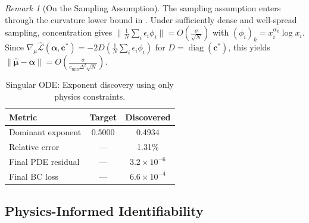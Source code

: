 \documentclass{article}
\theoremstyle{plain}
\theoremstyle{definition}
\theoremstyle{remark}
\newtheorem{remark}[theorem]{Remark}
\DeclareMathOperator{\diag}{diag}
\newcommand{\mcL}{\mathcal{L}}
\newcommand{\bmu}{\bm{\mu}}
\newcommand{\balpha}{\bm{\alpha}}
\newcommand{\bc}{\bm{c}}
\begin{document}
\begin{remark}[On the Sampling Assumption]
	\label{rmk:sampling}
	The sampling assumption enters through the curvature lower bound in . Under sufficiently dense and well-spread sampling, concentration gives $\|\frac{1}{N}\sum_i \epsilon_i \phi_i\| = O(\frac{\sigma}{\sqrt{N}})$ with $(\phi_i)_k = x_i^{\alpha_k}\log x_i$. Since $\nabla_{\mu} \hat{\mcL}(\balpha, \bc^*) = -2 D(\frac{1}{N}\sum_i \epsilon_i \phi_i)$ for $D=\diag(\bc^*)$, this yields $\|\hat{\bmu} - \balpha\| = O(\frac{\sigma}{c_{\min} \Delta^2 \sqrt{N}})$.
\end{remark}

\begin{table}[t!]
	\centering
	\caption{Singular ODE: Exponent discovery using only physics constraints.}
	\label{tab:exp3}
	\begin{tabular}{lcc}
		\arrayrulecolor{tablerule}\toprule
		\rowcolor{tableheader}
		Metric             & Target & Discovered           \\
		\midrule
		Dominant exponent  & 0.5000 & 0.4934               \\
		\rowcolor{tablerowalt}
		Relative error     & ---    & 1.31\%               \\
		Final PDE residual & ---    & $3.2 \times 10^{-6}$ \\
		\rowcolor{tablerowalt}
		Final BC loss      & ---    & $6.6 \times 10^{-4}$ \\
		\bottomrule
	\end{tabular}
\end{table}

\subsection{Physics-Informed Identifiability}
\end{document}
